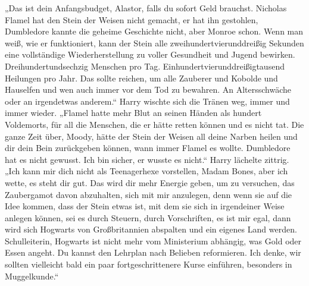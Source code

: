 „Das ist dein Anfangsbudget, Alastor, falls du sofort Geld brauchst. Nicholas Flamel hat den Stein der Weisen nicht gemacht, er hat ihn gestohlen, Dumbledore kannte die geheime Geschichte nicht, aber Monroe schon. Wenn man weiß, wie er funktioniert, kann der Stein alle zweihundertvierunddreißig Sekunden eine vollständige Wiederherstellung zu voller Gesundheit und Jugend bewirken. Dreihundertundsechzig Menschen pro Tag. Einhundertvierunddreißigtausend Heilungen pro Jahr. Das sollte reichen, um alle Zauberer und Kobolde und Hauselfen und wen auch immer vor dem Tod zu bewahren. An Altersschwäche oder an irgendetwas anderem.“
Harry wischte sich die Tränen weg, immer und immer wieder.
„Flamel hatte mehr Blut an seinen Händen als hundert Voldemorts, für all die Menschen, die er hätte retten können und es nicht tat. Die ganze Zeit über, Moody, hätte der Stein der Weisen all deine Narben heilen und dir dein Bein zurückgeben können, wann immer Flamel es wollte. Dumbledore hat es nicht gewusst. Ich bin sicher, er wusste es nicht.“
Harry lächelte zittrig.
„Ich kann mir dich nicht als Teenagerhexe vorstellen, Madam Bones, aber ich wette, es steht dir gut. Das wird dir mehr Energie geben, um zu versuchen, das Zaubergamot davon abzuhalten, sich mit mir anzulegen, denn wenn sie auf die Idee kommen, dass der Stein etwas ist, mit dem sie sich in irgendeiner Weise anlegen können, sei es durch Steuern, durch Vorschriften, es ist mir egal, dann wird sich Hogwarts von Großbritannien abspalten und ein eigenes Land werden. Schulleiterin, Hogwarts ist nicht mehr vom Ministerium abhängig, was Gold oder Essen angeht. Du kannst den Lehrplan nach Belieben reformieren. Ich denke, wir sollten vielleicht bald ein paar fortgeschrittenere Kurse einführen, besonders in Muggelkunde.“

